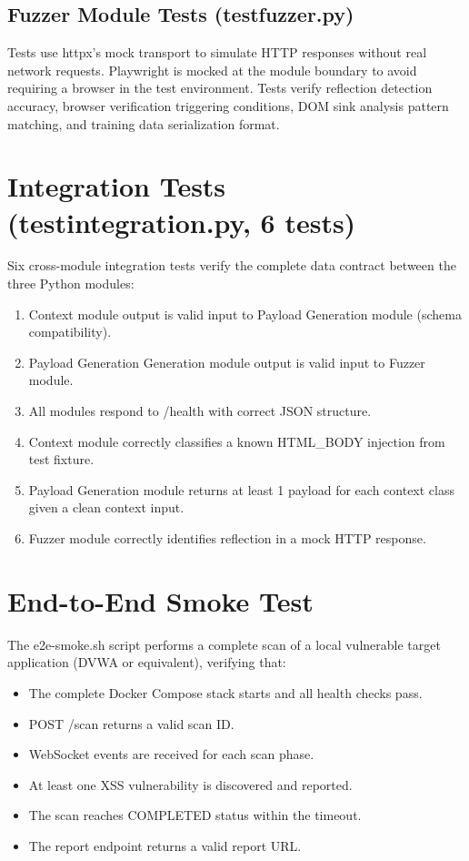 \subsection{Fuzzer Module Tests (test\textunderscore fuzzer.py)}
Tests use httpx's mock transport to simulate HTTP responses without real network requests. Playwright is mocked at the module boundary to avoid requiring a browser in the test environment. Tests verify reflection detection accuracy, browser verification triggering conditions, DOM sink analysis pattern matching, and training data serialization format.

\section{Integration Tests (test\textunderscore integration.py, 6 tests)}
Six cross-module integration tests verify the complete data contract between the three Python modules:
\begin{enumerate}[itemsep=2pt, topsep=-15pt]
    \item  Context module output is valid input to Payload Generation module (schema compatibility).
    \item Payload Generation Generation module output is valid input to Fuzzer module.
    \item All modules respond to /health with correct JSON structure.
    \item Context module correctly classifies a known HTML\_\allowbreak \allowbreak BODY injection from test fixture.
    \item Payload Generation module returns at least 1 payload for each context class given a clean context input.
    \item  Fuzzer module correctly identifies reflection in a mock HTTP response.

\end{enumerate}
\section{End-to-End Smoke Test}
The e2e-smoke.sh script performs a complete scan of a local vulnerable target application (DVWA or equivalent), verifying that:
\begin{itemize}[itemsep=2pt, topsep=-15pt]
    \item The complete Docker Compose stack starts and all health checks pass.
    \item POST /scan returns a valid scan ID.
    \item WebSocket events are received for each scan phase.
    \item At least one XSS vulnerability is discovered and reported.
    \item The scan reaches COMPLETED status within the timeout.
    \item The report endpoint returns a valid report URL.
\end{itemize}
